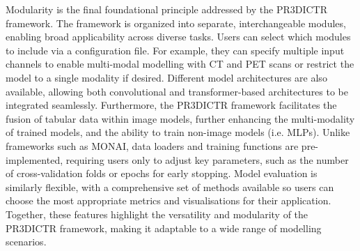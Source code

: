 \documentclass[11pt]{article}
\begin{document}
Modularity is the final foundational principle addressed by the PR3DICTR framework. The framework is organized into separate, interchangeable modules, enabling broad applicability across diverse tasks. Users can select which modules to include via a configuration file. For example, they can specify multiple input channels to enable multi-modal modelling with CT and PET scans or restrict the model to a single modality if desired. Different model architectures are also available, allowing both convolutional and transformer-based architectures to be integrated seamlessly. Furthermore, the PR3DICTR framework facilitates the fusion of tabular data within image models, further enhancing the multi-modality of trained models, and the ability to train non-image models (i.e. MLPs). Unlike frameworks such as MONAI, data loaders and training functions are pre-implemented, requiring users only to adjust key parameters, such as the number of cross-validation folds or epochs for early stopping. Model evaluation is similarly flexible, with a comprehensive set of methods available so users can choose the most appropriate metrics and visualisations for their application. Together, these features highlight the versatility and modularity of the PR3DICTR framework, making it adaptable to a wide range of modelling scenarios.
\end{document}
